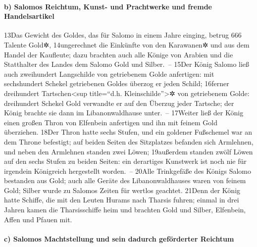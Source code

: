\hypertarget{b-salomos-reichtum-kunst--und-prachtwerke-und-fremde-handelsartikel}{%
\paragraph{b) Salomos Reichtum, Kunst- und Prachtwerke und fremde
Handelsartikel}\label{b-salomos-reichtum-kunst--und-prachtwerke-und-fremde-handelsartikel}}

13Das Gewicht des Goldes, das für Salomo in einem Jahre einging, betrug
666 Talente Gold✲, 14ungerechnet die Einkünfte von den Karawanen✲ und
aus dem Handel der Kaufleute; dazu brachten auch alle Könige von Arabien
und die Statthalter des Landes dem Salomo Gold und Silber.~-- 15Der
König Salomo ließ auch zweihundert Langschilde von getriebenem Golde
anfertigen: mit sechshundert Schekel getriebenen Goldes überzog er jeden
Schild; 16ferner dreihundert Tartschen\textless sup title=``d.h.
Kleinschilde''\textgreater✲ von getriebenem Golde: dreihundert Schekel
Gold verwandte er auf den Überzug jeder Tartsche; der König brachte sie
dann im Libanonwaldhause unter.~-- 17Weiter ließ der König einen großen
Thron von Elfenbein anfertigen und ihn mit feinem Gold überziehen. 18Der
Thron hatte sechs Stufen, und ein goldener Fußschemel war an dem Throne
befestigt; auf beiden Seiten des Sitzplatzes befanden sich Armlehnen,
und neben den Armlehnen standen zwei Löwen; 19außerdem standen zwölf
Löwen auf den sechs Stufen zu beiden Seiten: ein derartiges Kunstwerk
ist noch nie für irgendein Königreich hergestellt worden.~-- 20Alle
Trinkgefäße des Königs Salomo bestanden aus Gold; auch alle Geräte des
Libanonwaldhauses waren von feinem Gold; Silber wurde zu Salomos Zeiten
für wertlos geachtet. 21Denn der König hatte Schiffe, die mit den Leuten
Hurams nach Tharsis fuhren; einmal in drei Jahren kamen die
Tharsisschiffe heim und brachten Gold und Silber, Elfenbein, Affen und
Pfauen mit.

\hypertarget{c-salomos-machtstellung-und-sein-dadurch-gefuxf6rderter-reichtum}{%
\paragraph{c) Salomos Machtstellung und sein dadurch geförderter
Reichtum}\label{c-salomos-machtstellung-und-sein-dadurch-gefuxf6rderter-reichtum}}

